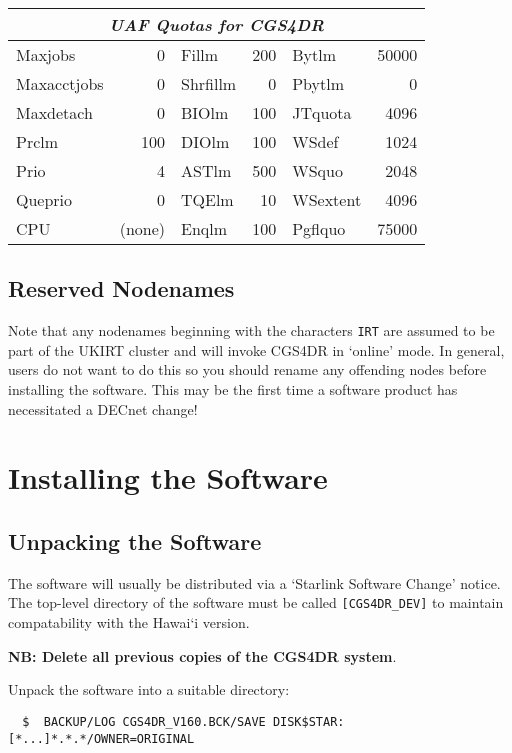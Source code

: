 \begin{center}
\begin{tabular}{|l r|l r|l r|}
\hline
\multicolumn{6}{|c|}{\sl UAF Quotas for CGS4DR} \\
\hline
Maxjobs     & 0      & Fillm    & 200  & Bytlm    & 50000 \\
Maxacctjobs & 0      & Shrfillm & 0    & Pbytlm   & 0 \\
Maxdetach   & 0      & BIOlm    & 100  & JTquota  & 4096 \\
Prclm       & 100    & DIOlm    & 100  & WSdef    & 1024 \\
Prio        & 4      & ASTlm    & 500  & WSquo    & 2048 \\
Queprio     & 0      & TQElm    & 10   & WSextent & 4096 \\
CPU         & (none) & Enqlm    & 100  & Pgflquo  & 75000 \\
\hline
\end{tabular}
\end{center}

\subsection{Reserved Nodenames}

Note that any nodenames beginning with the characters {\tt IRT} are assumed
to be part of the UKIRT cluster and will invoke CGS4DR in `online' mode.
In general, users do not want to do this so you should rename any offending
nodes before installing the software. This may be the first time a software
product has necessitated a DECnet change!

\section{Installing the Software}

\subsection{Unpacking the Software}
The software will usually be distributed via a `Starlink Software Change'
notice. The top-level directory of the software must be called
{\tt [CGS4DR\_DEV]} to maintain compatability with the Hawai`i version.

{\bf NB: Delete all previous copies of the CGS4DR system}.

Unpack the software into a suitable directory:

\begin{verbatim}
  $  BACKUP/LOG CGS4DR_V160.BCK/SAVE DISK$STAR:[*...]*.*.*/OWNER=ORIGINAL
\end{verbatim}

